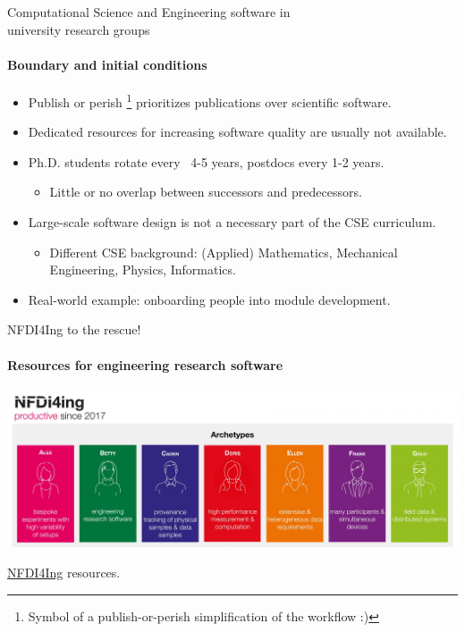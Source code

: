 

\begin{frame}{Computational Science and Engineering software in\\university research groups}
	\framesubtitle{Boundary and initial conditions}
	
	\vfill
	\begin{itemize}
            \item Publish or perish \faGraduationCap\footnote{Symbol of a publish-or-perish simplification of the workflow :)} prioritizes publications over scientific software.
		\item Dedicated resources for increasing software quality are usually not available.
		\item Ph.D. students rotate every ~4-5 years, postdocs every 1-2 years. 
			\begin{itemize}
				\item Little or no overlap between successors and predecessors. 
			\end{itemize}
		\item Large-scale software design is not a necessary part of the CSE curriculum. 
			\begin{itemize}
				\item Different CSE background: (Applied) Mathematics, Mechanical Engineering, Physics, Informatics.
			\end{itemize}
		\item Real-world example: onboarding people into \href{https://www.openfoam.com/documentation/guides/latest/api/classes.html}{} module development.
	\end{itemize}
\end{frame}

\begin{frame}{NFDI4Ing to the rescue!}
\framesubtitle{Resources for engineering research software}
    \vfill

    \begin{center}
    \includegraphics[width=\textwidth]{figures/nfdi4ing.jpg}
    \end{center}
    \href{https://nfdi4ing.de}{NFDI4Ing} resources. 

\end{frame}

